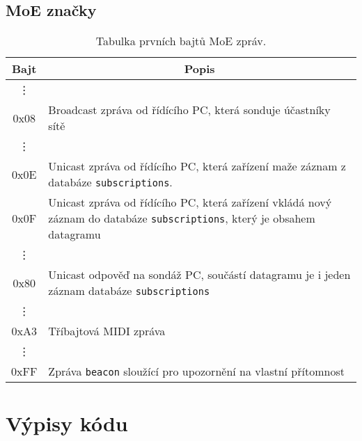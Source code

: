 \section{\acs{MoE} značky}\label{chpt:MoEZnacky}
\begin{table}[h]
	\centering
	\caption{Tabulka prvních bajtů \acs{MoE} zpráv.}
	\begin{tabular}{|  >{\ttfamily} c | p{} |}
		\hline
		\textnormal{Bajt} & \multicolumn{1}{|c|}{Popis} \\
		\hline \hline
		\vdots & \\
		
		0x08 & Broadcast zpráva od řídícího PC, která sonduje účastníky sítě \\
		
		\vdots & \\

		0x0E & Unicast zpráva od řídícího  PC, která zařízení maže záznam z databáze \texttt{subscriptions}. \\
		
		0x0F & Unicast zpráva od řídícího PC, která zařízení vkládá nový záznam do databáze \texttt{subscriptions}, který je obsahem datagramu \\
		
		\vdots & \\
		
		0x80 & Unicast odpověď na sondáž PC, součástí datagramu je i jeden záznam databáze \texttt{subscriptions} \\

		\vdots & \\

		0xA3 & Tříbajtová \acs{MIDI} zpráva \\
		
		\vdots & \\
		
		0xFF & Zpráva \texttt{beacon} sloužící pro upozornění na vlastní přítomnost \\
		\hline
	\end{tabular}
\end{table}


\chapter{Výpisy kódu}
